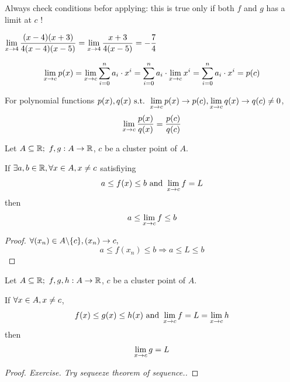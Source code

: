 \documentclass[a4paper,12pt]{article}
\begin{document}
\begin{remark}
    Always check conditions befor applying: this is true only if both \(f\) and \(g\) has a limit at \(c\) !
\end{remark}

\newpage
\begin{example}
    \(\displaystyle\lim_{x\rightarrow 4} {\frac{(x-4)(x+3)}{4(x-4)(x-5)}}=\lim_{x\rightarrow 4} {\frac{x+3}{4(x-5)}}=-\frac{7}{4}\)\\
\end{example}

\begin{corollary}
    \[\lim_{x\rightarrow c } {p(x)}=\lim_{x\rightarrow c } {\sum_{i=0}^{n}a_i\cdot x^i}=\sum_{i=0}^{n}a_i\cdot\lim_{x\rightarrow c } {x^i}=\sum_{i=0}^{n}a_i\cdot x^i=p(c)\]
\end{corollary}

\begin{corollary}
    For polynomial functions \(\displaystyle p(x),q(x)\text{ s.t. } \\\lim_{x\rightarrow c} {p(x)}\rightarrow p(c), \lim_{x\rightarrow c} {q(x)}\rightarrow q(c)\neq 0\),
    \[\lim_{x\rightarrow c } {\frac{p(x )}{q(x )}}=\frac{p(c )}{q(c )}\]
\end{corollary}

\begin{theorem}
    Let \(A\subseteq\R;\ f,g:A\rightarrow\R\), \(c \) be a cluster point of \(A\). 
    
    If \(\exists a,b\in\mathbb{R}, \forall x\in A, x\neq c\) satisfiying 
    \[a\le f(x)\le b\text{ and }\lim_{x\rightarrow c} {f}=L\]
    then \[a\le\lim_{x\rightarrow c} {f}\le b\]
    \begin{proof}
        \(\displaystyle \forall (x _{n })\in A\backslash\{c\}, (x _{n })\rightarrow c,\)
        \[a\le f(x_n)\le b\Rightarrow a\le L \le b\]
    \end{proof}
\end{theorem}

\begin{theorem}
    Let \(A\subseteq\R;\ f,g,h:A\rightarrow\R\), \(c \) be a cluster point of \(A\). 

    If \(\displaystyle\forall x\in A, x\neq c\), \[f(x)\le g(x) \le h(x)\text{ and }\lim_{x\rightarrow c} {f}=L=\lim_{x\rightarrow c} {h}\]
    then 
    \[\lim_{x\rightarrow c } {g}=L\]
    \begin{proof}[Proof. Exercise. Try sequeeze theorem of sequence.]
    \end{proof}
\end{theorem}
\end{document}
